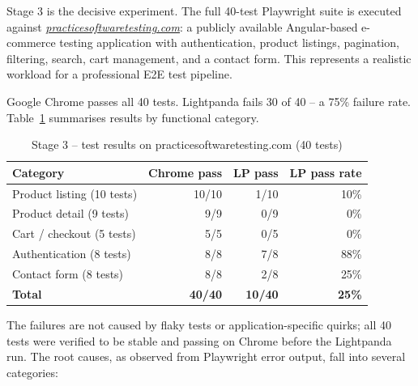 Stage 3 is the decisive experiment. The full 40-test Playwright suite is executed against \textit{\url{practicesoftwaretesting.com}}: a publicly available Angular-based e-commerce testing application with authentication, product listings, pagination, filtering, search, cart management, and a contact form. This represents a realistic workload for a professional E2E test pipeline.

Google Chrome passes all 40 tests. Lightpanda fails 30 of 40 -- a 75\% failure rate. Table~\ref{tab:stage3} summarises results by functional category.

\begin{table}[t]
\centering
\caption{Stage 3 -- test results on practicesoftwaretesting.com (40 tests)}
\label{tab:stage3}
\begin{tabular}{lrrr}
\toprule
\textbf{Category} & \textbf{Chrome pass} & \textbf{LP pass} & \textbf{LP pass rate} \\
\midrule
Product listing (10 tests)  & 10/10 & 1/10  & 10\% \\
Product detail (9 tests)    & 9/9   & 0/9   & 0\%  \\
Cart / checkout (5 tests)   & 5/5   & 0/5   & 0\%  \\
Authentication (8 tests)    & 8/8   & 7/8   & 88\% \\
Contact form (8 tests)      & 8/8   & 2/8   & 25\% \\
\midrule
\textbf{Total}              & \textbf{40/40} & \textbf{10/40} & \textbf{25\%} \\
\bottomrule
\end{tabular}
\end{table}

The failures are not caused by flaky tests or application-specific quirks; all 40 tests were verified to be stable and passing on Chrome before the Lightpanda run. The root causes, as observed from Playwright error output, fall into several categories:


